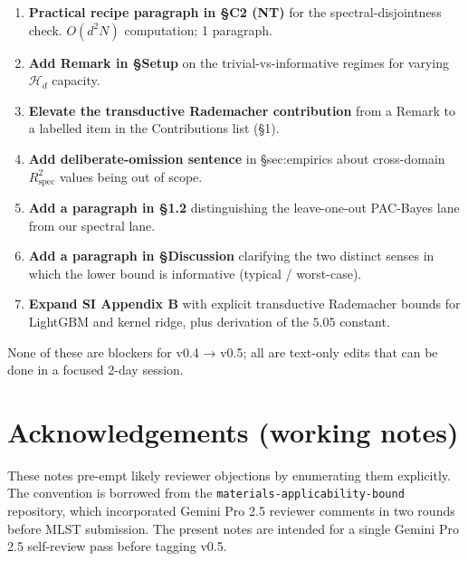 \documentclass[11pt,a4paper]{article}
\theoremstyle{plain}
\newcommand{\Rspec}{R^2_{\mathrm{spec}}}
\newcommand{\Hcal}{\mathcal{H}}
\begin{document}
\begin{enumerate}[label=\textbf{P\arabic*.}]
\item \textbf{Practical recipe paragraph in §C2 (NT)} for the spectral-disjointness
    check.  $O(d^2 N)$ computation; 1 paragraph.
\item \textbf{Add Remark in §Setup} on the trivial-vs-informative
    regimes for varying $\Hcal_d$ capacity.
\item \textbf{Elevate the transductive Rademacher contribution} from
    a Remark to a labelled item in the Contributions list (§1).
\item \textbf{Add deliberate-omission sentence} in §sec:empirics about
    cross-domain $\Rspec$ values being out of scope.
\item \textbf{Add a paragraph in §1.2} distinguishing the leave-one-out
    PAC-Bayes lane from our spectral lane.
\item \textbf{Add a paragraph in §Discussion} clarifying the two
    distinct senses in which the lower bound is informative
    (typical / worst-case).
\item \textbf{Expand SI Appendix B} with explicit transductive
    Rademacher bounds for LightGBM and kernel ridge, plus
    derivation of the $5.05$ constant.
\end{enumerate}

None of these are blockers for v0.4 → v0.5; all are text-only edits
that can be done in a focused 2-day session.

\section*{Acknowledgements (working notes)}

These notes pre-empt likely reviewer objections by enumerating them
explicitly.  The convention is borrowed from the
\texttt{materials-applicability-bound} repository, which incorporated
Gemini Pro 2.5 reviewer comments in two rounds before MLST submission.
The present notes are intended for a single Gemini Pro 2.5 self-review
pass before tagging v0.5.


\end{document}
